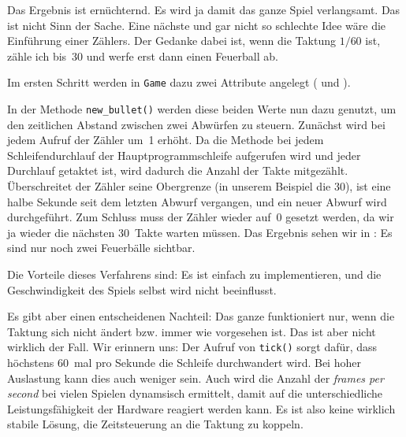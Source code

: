 Das Ergebnis ist ernüchternd. Es wird ja damit das ganze Spiel verlangsamt. Das ist nicht Sinn der Sache. Eine nächste und gar nicht so schlechte Idee wäre die Einführung einer Zählers. Der Gedanke dabei ist, wenn die Taktung $1/60$ ist, zähle ich bis~30 und werfe erst dann einen Feuerball ab. 

Im ersten Schritt werden in \texttt{Game} dazu zwei Attribute angelegt ( und ). 



In der Methode \texttt{new\_bullet()} werden diese beiden Werte nun dazu genutzt, um den zeitlichen Abstand zwischen zwei Abwürfen zu steuern. Zunächst wird bei jedem Aufruf der Zähler um~1 erhöht. Da die Methode bei jedem Schleifendurchlauf der Hauptprogrammschleife aufgerufen wird und jeder Durchlauf getaktet ist, wird dadurch die Anzahl der Takte mitgezählt. Überschreitet der Zähler seine Obergrenze (in unserem Beispiel die 30), ist eine halbe Sekunde seit dem letzten Abwurf vergangen, und ein neuer Abwurf wird durchgeführt. Zum Schluss muss der Zähler wieder auf~0 gesetzt werden, da wir ja wieder die nächsten 30~Takte warten müssen. Das Ergebnis sehen wir in : Es sind nur noch zwei Feuerbälle sichtbar.




Die Vorteile dieses Verfahrens sind: Es ist einfach zu implementieren, und die Geschwindigkeit des Spiels selbst wird nicht beeinflusst. 

Es gibt aber einen entscheidenen Nachteil: Das ganze funktioniert nur, wenn die Taktung sich nicht ändert bzw. immer wie vorgesehen ist. Das ist aber nicht wirklich der Fall. Wir erinnern uns: Der Aufruf von \texttt{tick()} sorgt dafür, dass höchstens 60~mal pro Sekunde die Schleife durchwandert wird. Bei hoher Auslastung kann dies auch weniger sein. Auch wird die Anzahl der \emph{frames per second} bei vielen Spielen dynamsisch ermittelt, damit auf die unterschiedliche Leistungsfähigkeit der Hardware reagiert werden kann. Es ist also keine wirklich stabile Lösung, die Zeitsteuerung an die Taktung zu koppeln. 

